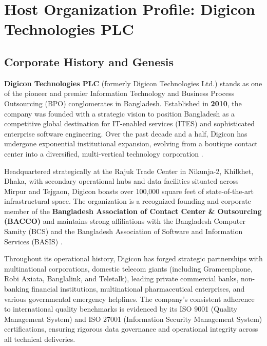 \chapter{Host Organization Profile: Digicon Technologies PLC}
\label{ch:organization_profile}

\section{Corporate History and Genesis}
\label{sec:org_history}

\textbf{Digicon Technologies PLC} (formerly Digicon Technologies Ltd.) stands as one of the pioneer and premier Information Technology and Business Process Outsourcing (BPO) conglomerates in Bangladesh. Established in \textbf{2010}, the company was founded with a strategic vision to position Bangladesh as a competitive global destination for IT-enabled services (ITES) and sophisticated enterprise software engineering. Over the past decade and a half, Digicon has undergone exponential institutional expansion, evolving from a boutique contact center into a diversified, multi-vertical technology corporation \citep{digicon2026corp}.

Headquartered strategically at the Rajuk Trade Center in Nikunja-2, Khilkhet, Dhaka, with secondary operational hubs and data facilities situated across Mirpur and Tejgaon, Digicon boasts over 100,000 square feet of state-of-the-art infrastructural space. The organization is a recognized founding and corporate member of the \textbf{Bangladesh Association of Contact Center \& Outsourcing (BACCO)} and maintains strong affiliations with the Bangladesh Computer Samity (BCS) and the Bangladesh Association of Software and Information Services (BASIS) \citep{bacco2024report}.

Throughout its operational history, Digicon has forged strategic partnerships with multinational corporations, domestic telecom giants (including Grameenphone, Robi Axiata, Banglalink, and Teletalk), leading private commercial banks, non-banking financial institutions, multinational pharmaceutical enterprises, and various governmental emergency helplines. The company's consistent adherence to international quality benchmarks is evidenced by its ISO 9001 (Quality Management System) and ISO 27001 (Information Security Management System) certifications, ensuring rigorous data governance and operational integrity across all technical deliveries.

